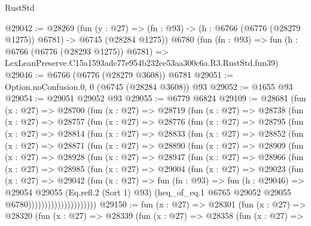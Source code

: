 \begin{lexlean}{RustStd}
\begin{coremodule}
@29042 := @28269
    (fun (y : @27) =>
    (fn : @93) -> (h : @6766 (@6776 (@28279 @1275)) @6781) -> @6745 (@28284 @1275))
    @6780
    (fun (fn : @93) =>
    fun (h : @6766 (@6776 (@28293 @1275)) @6781) =>
    LexLeanPreserve.C15a1593adc77e954b232ce53aa300c6a.R3.RustStd.fun39)
@29046 := @6766 (@6776 (@28279 @3608)) @6781
@29051 := Option.noConfusion.{0, 0} (@6745 (@28284 @3608)) @93
@29052 := @1655 @93
@29054 := @29051 @29052 @93
@29055 := @6779 @6824
@29109 := @28681
    (fun (x : @27) =>
    @28700
      (fun (x : @27) =>
      @28719
        (fun (x : @27) =>
        @28738
          (fun (x : @27) =>
          @28757
            (fun (x : @27) =>
            @28776
              (fun (x : @27) =>
              @28795
                (fun (x : @27) =>
                @28814
                  (fun (x : @27) =>
                  @28833
                    (fun (x : @27) =>
                    @28852
                      (fun (x : @27) =>
                      @28871
                        (fun (x : @27) =>
                        @28890
                          (fun (x : @27) =>
                          @28909
                            (fun (x : @27) =>
                            @28928
                              (fun (x : @27) =>
                              @28947
                                (fun (x : @27) =>
                                @28966
                                  (fun (x : @27) =>
                                  @28985
                                    (fun (x : @27) =>
                                    @29004
                                      (fun (x : @27) =>
                                      @29023
                                        (fun (x : @27) =>
                                        @29042
                                          (fun (x : @27) =>
                                          fun (fn : @93) =>
                                          fun (h : @29046) =>
                                          @29054
                                            @29055
                                            (Eq.refl.{2} (Sort 1) @93)
                                            (heq_of_eq.{1}
                                              @6765
                                              @29052
                                              @29055
                                              @6780)))))))))))))))))))))
@29150 := fun (x : @27) =>
  @28301
    (fun (x : @27) =>
    @28320
      (fun (x : @27) =>
      @28339
        (fun (x : @27) =>
        @28358
          (fun (x : @27) =>

\end{coremodule}
\end{lexlean}

